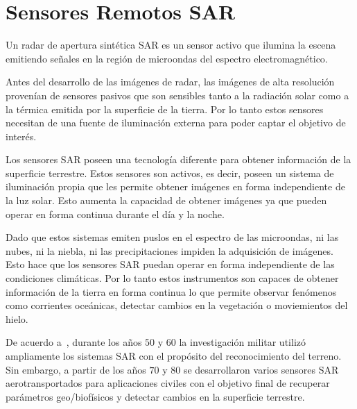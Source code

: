 

\section{Sensores Remotos SAR}


Un radar de apertura sintética SAR es un sensor activo que ilumina la escena emitiendo señales en la región de microondas del espectro electromagnético.

Antes del desarrollo de las imágenes de radar, las imágenes de alta resolución provenían de sensores pasivos que son sensibles tanto a la radiación solar como a la térmica emitida por la superficie de la tierra. Por lo tanto estos sensores necesitan de una fuente de iluminación externa para poder captar el objetivo de interés. 

Los sensores SAR poseen una tecnología diferente para obtener información de la superficie terrestre. Estos sensores son activos, es decir, poseen un sistema de iluminación propia que les permite obtener imágenes en forma independiente de la luz solar. Esto aumenta la capacidad de obtener imágenes ya que pueden operar en forma continua durante el día y la noche.

Dado que estos sistemas emiten puslos en el espectro de las microondas, ni las nubes, ni la niebla, ni las precipitaciones impiden la adquisición de imágenes. Esto hace que los sensores SAR puedan operar en forma independiente de las condiciones climáticas. Por lo tanto estos instrumentos son capaces de obtener información de la tierra en forma continua lo que permite observar fenómenos como corrientes oceánicas, detectar cambios en la vegetación o moviemientos del hielo.


De acuerdo a~\cite{Moreira2013}, durante los años $50$ y $60$ la investigación militar utilizó ampliamente los sistemas SAR con el propósito del reconocimiento del terreno. Sin embargo, a partir de los años $70$ y $80$ se desarrollaron varios sensores SAR aerotransportados  para aplicaciones civiles con el objetivo final de recuperar parámetros geo/biofísicos y detectar cambios en la superficie terrestre.

